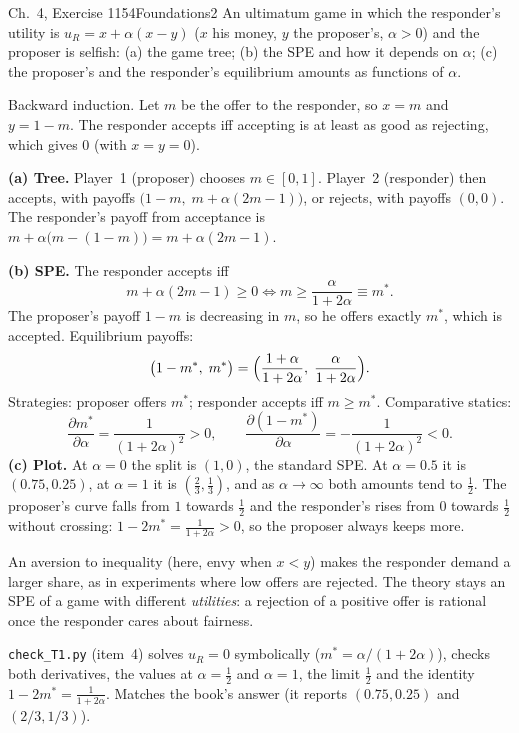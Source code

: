 \begin{exsol}{\MG{} Ch.~4, Exercise 1}{154}{Foundations}{2}
\asked An ultimatum game in which the responder's utility is $u_R = x + \alpha(x - y)$ ($x$ his money,
$y$ the proposer's, $\alpha > 0$) and the proposer is selfish: (a) the game tree; (b) the SPE and how it
depends on $\alpha$; (c) the proposer's and the responder's equilibrium amounts as functions of $\alpha$.

\method Backward induction. Let $m$ be the offer to the responder, so $x = m$ and $y = 1 - m$. The responder
accepts iff accepting is at least as good as rejecting, which gives $0$ (with $x = y = 0$).

\solution
\textbf{(a) Tree.} Player~1 (proposer) chooses $m \in [0,1]$. Player~2 (responder) then accepts, with
payoffs $\bigl(1 - m,\; m + \alpha(2m - 1)\bigr)$, or rejects, with payoffs $(0, 0)$. The responder's
payoff from acceptance is $m + \alpha\bigl(m - (1-m)\bigr) = m + \alpha(2m-1)$.

\textbf{(b) SPE.} The responder accepts iff
\[
  m + \alpha(2m - 1) \ge 0 \iff m \ge \frac{\alpha}{1 + 2\alpha} \equiv m^* .
\]
The proposer's payoff $1 - m$ is decreasing in $m$, so he offers exactly $m^*$, which is accepted.
Equilibrium payoffs:
\[
  \bigl(1 - m^*,\; m^*\bigr) = \Bigl(\frac{1 + \alpha}{1 + 2\alpha},\; \frac{\alpha}{1 + 2\alpha}\Bigr).
\]
Strategies: proposer offers $m^*$; responder accepts iff $m \ge m^*$. Comparative statics:
\[
  \frac{\partial m^*}{\partial \alpha} = \frac{1}{(1+2\alpha)^2} > 0, \qquad
  \frac{\partial (1 - m^*)}{\partial \alpha} = -\frac{1}{(1+2\alpha)^2} < 0 .
\]
\textbf{(c) Plot.} At $\alpha = 0$ the split is $(1, 0)$, the standard SPE. At $\alpha = 0.5$ it is
$(0.75, 0.25)$, at $\alpha = 1$ it is $(\frac23, \frac13)$, and as $\alpha \to \infty$ both amounts tend to
$\frac12$. The proposer's curve falls from $1$ towards $\frac12$ and the responder's rises from $0$ towards
$\frac12$ without crossing: $1 - 2m^* = \frac{1}{1+2\alpha} > 0$, so the
proposer always keeps more.

\interp An aversion to inequality (here, envy when $x < y$) makes the responder demand a larger share,
as in experiments where low offers are rejected. The theory stays an SPE of a game with different
\emph{utilities}: a rejection of a positive offer is rational once the responder cares about fairness.

\verify \texttt{check\_T1.py} (item~4) solves $u_R = 0$ symbolically ($m^* = \alpha/(1+2\alpha)$), checks both
derivatives, the values at $\alpha = \frac12$ and $\alpha = 1$, the limit $\frac12$ and the identity
$1 - 2m^* = \frac{1}{1+2\alpha}$. Matches the book's answer (it reports $(0.75, 0.25)$ and $(2/3, 1/3)$).

\end{exsol}

